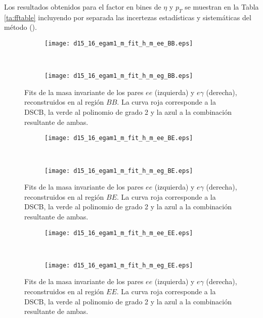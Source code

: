 Los resultados obtenidos para el factor en bines de $\eta$ y $p_{T}$ se muestran en la Tabla \ref{ta:fftable} incluyendo por separada las incertezas estadísticas y sistemáticas del método ().




\begin{figure}

	\begin{subfigure}{0.5\textwidth}
		\texttt{[image: d15\_16\_egam1\_m\_fit\_h\_m\_ee\_BB.eps]} 
	\end{subfigure}
	~
	\begin{subfigure}{0.5\textwidth}
		\texttt{[image: d15\_16\_egam1\_m\_fit\_h\_m\_eg\_BB.eps]}
	\end{subfigure}

	
	\caption{Fits de la masa invariante de los pares $ee$ (izquierda) y $e\gamma$ (derecha), reconstruidos en al región $BB$. La curva roja corresponde a la DSCB, la verde al polinomio de grado 2 y la azul a la combinación resultante de ambas.}
\label{fits_BB}
\end{figure}

\begin{figure}

	\begin{subfigure}{0.5\textwidth}
		\texttt{[image: d15\_16\_egam1\_m\_fit\_h\_m\_ee\_BE.eps]} 
	\end{subfigure}
	~
	\begin{subfigure}{0.5\textwidth}
		\texttt{[image: d15\_16\_egam1\_m\_fit\_h\_m\_eg\_BE.eps]}
	\end{subfigure}

	
	\caption{Fits de la masa invariante de los pares $ee$ (izquierda) y $e\gamma$ (derecha), reconstruidos en al región $BE$. La curva roja corresponde a la DSCB, la verde al polinomio de grado 2 y la azul a la combinación resultante de ambas.}
\label{fits_BE}
\end{figure}


\begin{figure}

	\begin{subfigure}{0.5\textwidth}
		\texttt{[image: d15\_16\_egam1\_m\_fit\_h\_m\_ee\_EE.eps]} 
	\end{subfigure}
	~
	\begin{subfigure}{0.5\textwidth}
		\texttt{[image: d15\_16\_egam1\_m\_fit\_h\_m\_eg\_EE.eps]}
	\end{subfigure}

	
	\caption{Fits de la masa invariante de los pares $ee$ (izquierda) y $e\gamma$ (derecha), reconstruidos en al región $EE$. La curva roja corresponde a la DSCB, la verde al polinomio de grado 2 y la azul a la combinación resultante de ambas.}
\label{fits_EE}
\end{figure}


